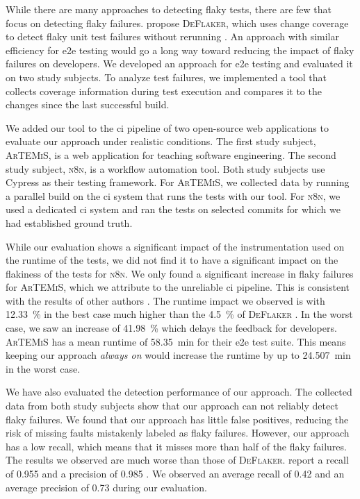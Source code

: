 While there are many approaches to detecting flaky tests, there are few that focus on detecting flaky failures.
 propose \textsc{DeFlaker}, which uses change coverage to detect flaky unit test failures without rerunning \cite{bell_deflaker_2018}.
An approach with similar efficiency for \ac{e2e} testing would go a long way toward reducing the impact of flaky failures on developers.
We developed an approach for \ac{e2e} testing and evaluated it on two study subjects.
To analyze test failures, we implemented a tool that collects coverage information during test execution and compares it to the changes since the last successful build.

We added our tool to the \ac{ci} pipeline of two open-source web applications to evaluate our approach under realistic conditions.
The first study subject, \textsc{ArTEMiS}, is a web application for teaching software engineering.
The second study subject, \textsc{n8n}, is a workflow automation tool.
Both study subjects use Cypress as their testing framework.
For \textsc{ArTEMiS}, we collected data by running a parallel build on the \ac{ci} system that runs the tests with our tool.
For \textsc{n8n}, we used a dedicated \ac{ci} system and ran the tests on selected commits for which we had established ground truth.

While our evaluation shows a significant impact of the instrumentation used on the runtime of the tests, we did not find it to have a significant impact on the flakiness of the tests for \textsc{n8n}.
We only found a significant increase in flaky failures for \textsc{ArTEMiS}, which we attribute to the unreliable \ac{ci} pipeline.
This is consistent with the results of other authors \autocite{rasheed_effect_2023}.
The runtime impact we observed is with \SI{12.33}{\percent} in the best case much higher than the \SI{4.5}{\percent} of \textsc{DeFlaker} \autocite{bell_deflaker_2018}.
In the worst case, we saw an increase of \SI{41.98}{\percent} which delays the feedback for developers.
\textsc{ArTEMiS} has a mean runtime of \SI{58.35}{\minute} for their \ac{e2e} test suite.
This means keeping our approach \textit{always on} would increase the runtime by up to \SI{24.507}{\minute} in the worst case.

We have also evaluated the detection performance of our approach.
The collected data from both study subjects show that our approach can not reliably detect flaky failures.
We found that our approach has little false positives, reducing the risk of missing faults mistakenly labeled as flaky failures.
However, our approach has a low recall, which means that it misses more than half of the flaky failures.
The results we observed are much worse than those of \textsc{DeFlaker}.
 report a recall of \num{0.955} and a precision of \num{0.985} \autocite{bell_deflaker_2018}.
We observed an average recall of \num{0.42} and an average precision of \num{0.73} during our evaluation.

